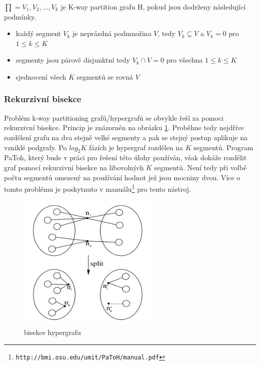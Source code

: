 \documentclass[thesis=M,czech]{FITthesis}[2012/06/26]
\begin{document}
\medskip
$\prod = {V_1, V_2, ..., V_k} $ je K-way partition grafu H, pokud jsou dodrženy následující podmínky.
\begin{itemize}
\item každý segment $V_k$ je neprázdná podmnožina $V$, tedy $V_k \subseteq V$ a $V_k = 0$ pro $1 \leq k \leq K$
\item segmenty jsou párově disjunktní tedy $V_k \cap V = 0 $ pro všechna $1 \leq k \leq K$
\item sjednocení všech $K$ segmentů se rovná $V$
\end{itemize}

\subsubsection{Rekurzivní bisekce}
Problém k-way partitioning grafů/hypergrafů se obvykle řeší za pomoci rekurzivní bisekce. Princip je znázorněn na obrázku \ref{figbisection}. Proběhne tedy nejdříve rozdělení grafu na dva stejně velké segmenty a pak se stejný postup aplikuje na vzniklé podgrafy. Po $log_2K$ fázích je hypergraf rozdělen na $K$ segmentů. Program PaToh, který bude v práci pro řešení této úlohy používán, však dokáže rozdělit graf pomocí rekurzivní bisekce na libovolných $K$ segmentů. Není tedy při volbě počtu segmentů omezený na používání hodnot jež jsou mocniny dvou. Více o tomto problému je poskytnuto v manuálu\footnote{\texttt{http://bmi.osu.edu/umit/PaToH/manual.pdf}} pro tento nástroj. 




\begin{figure}[h]\centering
	\includegraphics[width=0.6\textwidth, angle=0]{files/bisection.png}
	\caption[bisekce hypergrafu]{bisekce hypergrafu}\label{figbisection}
\end{figure}
\end{document}
